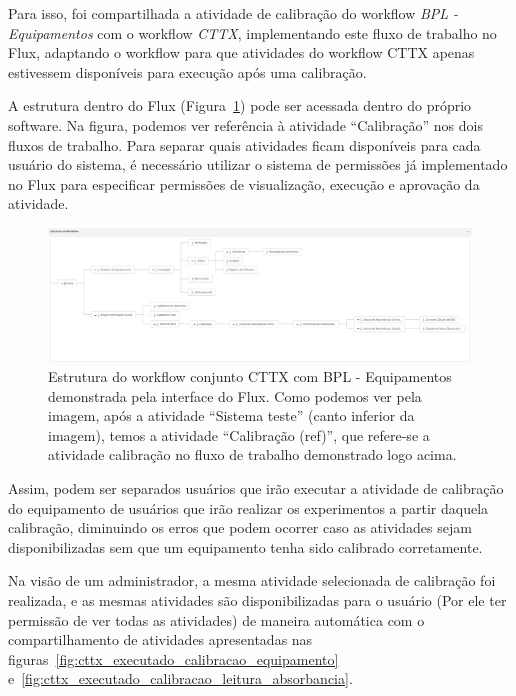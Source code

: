 Para isso, foi compartilhada a atividade de calibração do workflow \textit{BPL - Equipamentos} com o workflow \textit{CTTX}, implementando este fluxo de trabalho no Flux, adaptando o workflow para que atividades do workflow CTTX apenas estivessem disponíveis para execução após uma calibração.

A estrutura dentro do Flux (Figura~\ref{fig:cttx_bpl_flux}) pode ser acessada dentro do próprio software. Na figura, podemos ver referência à atividade ``Calibração'' nos dois fluxos de trabalho. Para separar quais atividades ficam disponíveis para cada usuário do sistema, é necessário utilizar o sistema de permissões já implementado no Flux para especificar permissões de visualização, execução e aprovação da atividade.

\begin{figure}
    \centering
    \includegraphics[width=1\textwidth]{imgs/CTTX-EQP/estrutura_cttx_eqp_flux.png}
    \caption{Estrutura do workflow conjunto CTTX com BPL - Equipamentos demonstrada pela interface do Flux. Como podemos ver pela imagem, após a atividade ``Sistema teste'' (canto inferior da imagem), temos a atividade ``Calibração (ref)'', que refere-se a atividade calibração no fluxo de trabalho demonstrado logo acima.}
    \label{fig:cttx_bpl_flux}
\end{figure}

Assim, podem ser separados usuários que irão executar a atividade de calibração do equipamento de usuários que irão realizar os experimentos a partir daquela calibração, diminuindo os erros que podem ocorrer caso as atividades sejam disponibilizadas sem que um equipamento tenha sido calibrado corretamente.

Na visão de um administrador, a mesma atividade selecionada de calibração foi realizada, e as mesmas atividades são disponibilizadas para o usuário (Por ele ter permissão de ver todas as atividades) de maneira automática com o compartilhamento de atividades apresentadas nas figuras~\ref{fig:cttx_executado_calibracao_equipamento} e~\ref{fig:cttx_executado_calibracao_leitura_absorbancia}.

